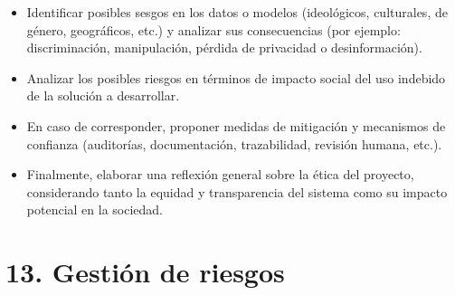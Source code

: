 \documentclass[
11pt, %
codirector, %
]{charter}
\begin{document}
\begin{itemize}
	\item Identificar posibles sesgos en los datos o modelos (ideológicos, culturales, de género, geográficos, etc.) y analizar sus consecuencias (por ejemplo: discriminación, manipulación, pérdida de privacidad o desinformación).
	\item Analizar los posibles riesgos en términos de impacto social del uso indebido de la solución a desarrollar.
	\item En caso de corresponder, proponer medidas de mitigación y mecanismos de confianza (auditorías, documentación, trazabilidad, revisión humana, etc.).
	\item Finalmente, elaborar una reflexión general sobre la ética del proyecto, considerando tanto la equidad y transparencia del sistema como su impacto potencial en la sociedad.

\end{itemize}


\section{13. Gestión de riesgos}
\label{sec:riesgos}
\end{document}

